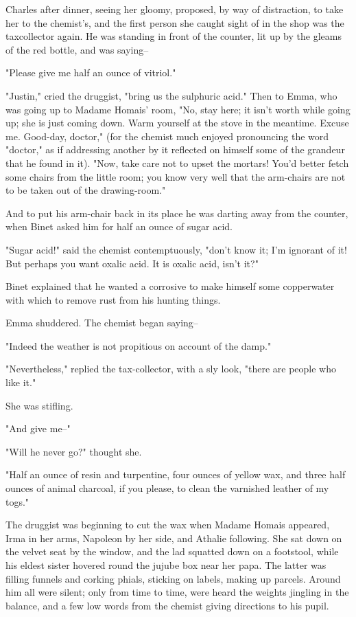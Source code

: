 \documentclass{tufte-book}
\begin{document}
Charles after dinner, seeing her gloomy, proposed, by way of
distraction, to take her to the chemist's, and the first person she
caught sight of in the shop was the taxcollector again. He was standing
in front of the counter, lit up by the gleams of the red bottle, and was
saying--

"Please give me half an ounce of vitriol."

"Justin," cried the druggist, "bring us the sulphuric acid." Then to
Emma, who was going up to Madame Homais' room, "No, stay here; it isn't
worth while going up; she is just coming down. Warm yourself at the
stove in the meantime. Excuse me. Good-day, doctor," (for the chemist
much enjoyed pronouncing the word "doctor," as if addressing another by
it reflected on himself some of the grandeur that he found in it). "Now,
take care not to upset the mortars! You'd better fetch some chairs from
the little room; you know very well that the arm-chairs are not to be
taken out of the drawing-room."

And to put his arm-chair back in its place he was darting away from the
counter, when Binet asked him for half an ounce of sugar acid.

"Sugar acid!" said the chemist contemptuously, "don't know it; I'm
ignorant of it! But perhaps you want oxalic acid. It is oxalic acid,
isn't it?"

Binet explained that he wanted a corrosive to make himself some
copperwater with which to remove rust from his hunting things.

Emma shuddered. The chemist began saying--

"Indeed the weather is not propitious on account of the damp."

"Nevertheless," replied the tax-collector, with a sly look, "there are
people who like it."

She was stifling.

"And give me--"

"Will he never go?" thought she.

"Half an ounce of resin and turpentine, four ounces of yellow wax,
and three half ounces of animal charcoal, if you please, to clean the
varnished leather of my togs."

The druggist was beginning to cut the wax when Madame Homais appeared,
Irma in her arms, Napoleon by her side, and Athalie following. She sat
down on the velvet seat by the window, and the lad squatted down on a
footstool, while his eldest sister hovered round the jujube box near
her papa. The latter was filling funnels and corking phials, sticking on
labels, making up parcels. Around him all were silent; only from time
to time, were heard the weights jingling in the balance, and a few low
words from the chemist giving directions to his pupil.
\end{document}
